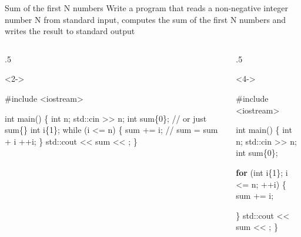 \begin{frame}[fragile]{Sum of the first N numbers}
  Write a program that reads a non-negative integer number N from standard
  input, computes the sum of the first N numbers and writes the result to
  standard output

  \begin{columns}[T]

    \begin{column}{.5\textwidth}
      \begin{codeblock}<2->{
#include <iostream>

int main()
\{
  int n;
  std::cin >> n;
  int sum\{0\}; // or just sum\{\}
  \alert<3->{int i\{1\};}
  while (\alert<3->{i <= n}) \{
    sum += i;   // sum = sum + i
    \alert<3->{++i};
  \}
  std::cout <{}< sum <{}< \bslashn;
\}}\end{codeblock}

    \end{column}

    \begin{column}{.5\textwidth}
      \begin{codeblock}<4->{
#include <iostream>

int main()
\{
  int n;
  std::cin >> n;
  int sum\{0\};

  \textbf<4>{for} (\alert<4>{int i\{1\}}; \alert<4>{i <= n}; \alert<4>{++i}) \{
    sum += i;

  \}
  std::cout <{}< sum <{}< \bslashn;
\}}\end{codeblock}
    \end{column}

  \end{columns}
\end{frame}


